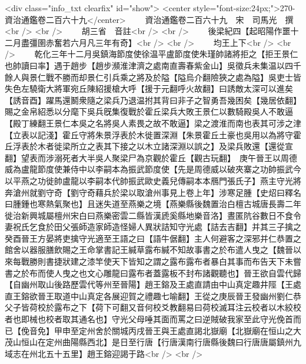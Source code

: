 <div class="info_txt clearfix" id="show">
<center style="font-size:24px;">270-資治通鑑卷二百六十九</center>
  　　資治通鑑卷二百六十九　宋　司馬光　撰<br />
<br />
　　胡三省　音註<br />
<br />
　　後梁紀四【起昭陽作噩十二月盡彊圉赤奮若六月凡三年有奇】<br />
<br />
　　均王上下<br />
<br />
　　乾化三年十二月吳鎮海節度使徐温平盧節度使朱瑾帥諸將拒之【拒王景仁也帥讀曰率】遇于趙步【趙步瀕淮津濟之處南直壽春紫金山】吳徵兵未集温以四千餘人與景仁戰不勝而却景仁引兵乘之將及於隘【隘烏介翻險狹之處為隘】吳吏士皆失色左驍衛大將軍宛丘陳紹援槍大呼【援于元翻呼火故翻】曰誘敵太深可以進矣【誘音酉】躍馬還鬭衆隨之梁兵乃退温拊其背曰非子之智勇吾幾困矣【幾居依翻】賜之金帛紹悉以分麾下吳兵旣集復戰於霍丘梁兵大敗王景仁以數騎殿吳人不敢逼【殿丁練翻王景仁本吳之名將吳人素畏之故不敢逼】梁之渡淮而南也表其可涉之津【立表以記淺】霍丘守將朱景浮表於木徙置深淵【朱景霍丘土豪也吳用以為將守霍丘浮表於木者徙梁所立之表其下接之以木立諸深淵以誤之】及梁兵敗還【還從宣翻】望表而涉溺死者大半吳人聚梁尸為京觀於霍丘【觀古玩翻】　庚午晉王以周德威為盧龍節度使兼侍中以李嗣本為振武節度使【先是周德威以破夾寨之功帥振武今以平燕之功徙帥盧龍以李嗣本代帥振武歐史義兒傳嗣本本鴈門張氏子】燕主守光將奔滄州就劉守奇【劉守奇藉兵於梁以取滄州事見上卷上年】涉寒足腫【史炤曰釋名曰腫鍾也寒熱氣聚也】且迷失道至燕樂之境【燕樂縣後魏置治白檀古城唐長壽二年徙治新興城屬檀州宋白曰燕樂密雲二縣皆漢虒奚縣地樂音洛】晝匿阬谷數日不食令妻祝氏乞食於田父張師造家師造怪婦人異狀詰知守光處【詰去吉翻】并其三子擒之癸酉晉王方晏將吏擒守光適至王語之曰【語牛倨翻】主人何避客之深邪并仁恭置之館舍以器服膳飲賜之王命掌書記王緘草露布緘不知故事書之於布遣人曳之【魏晉以來每戰勝則書捷狀建之漆竿使天下皆知之謂之露布露布者暴白其事而布告天下未嘗書之於布而使人曳之也文心雕龍曰露布者蓋露板不封布諸觀聽也】晉王欲自雲代歸【自幽州取山後路歷雲代等州至晉陽】趙王鎔及王處直請由中山真定趣井陘【王處直王鎔欲晉王取道中山真定各展迎賀之禮趣七喻翻】王從之庚辰晉王發幽州劉仁恭父子皆荷校於露布之下【荷下可翻又音何校爻教翻易曰荷校滅耳注云校者以木絞校者也即械也校者取其通名也】守光父母唾其面而罵之曰逆賊破我家至此守光俛首而已【俛音免】甲申至定州舍於關城丙戌晉王與王處直謁北嶽廟【北嶽廟在恒山之大茂山恒山在定州曲陽縣西北】是日至行唐【行唐漢南行唐縣後魏曰行唐唐屬鎮州九域志在州北五十五里】趙王鎔迎謁于路<br />
<br />
